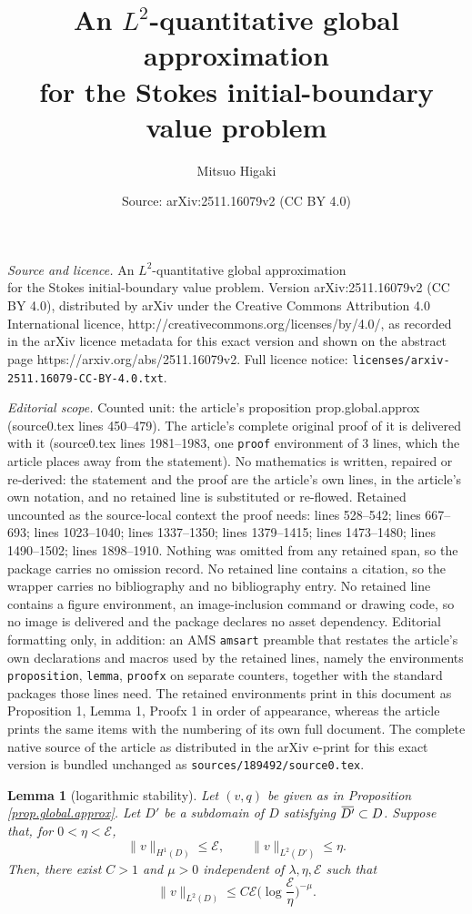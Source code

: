 \documentclass[10pt,a4paper]{amsart}
\title{An $L^2$-quantitative global approximation \\ for the Stokes initial-boundary value problem}
\author{Mitsuo Higaki}
\date{Source: arXiv:2511.16079v2 (CC BY 4.0)}
\newtheorem{lemma}{Lemma}
\newcommand{\overbar}[1]{\mkern 1.5mu\overline{\mkern-1.5mu#1\mkern-1.5mu}\mkern 1.5mu}
\begin{document}
\maketitle

\noindent\emph{Source and licence.} An $L^2$-quantitative global approximation \\ for the Stokes initial-boundary value problem. Version arXiv:2511.16079v2 (CC BY 4.0), distributed by arXiv under the Creative Commons Attribution 4.0 International licence, http://creativecommons.org/licenses/by/4.0/, as recorded in the arXiv licence metadata for this exact version and shown on the abstract page https://arxiv.org/abs/2511.16079v2. Full licence notice: \texttt{licenses/arxiv-2511.16079-CC-BY-4.0.txt}.\par\smallskip

\noindent\textit{Editorial scope.} Counted unit: the article's proposition prop.global.approx (source0.tex lines 450--479). The article's complete original proof of it is delivered with it (source0.tex lines 1981--1983, one \texttt{proof} environment of 3 lines, which the article places away from the statement). No mathematics is written, repaired or re-derived: the statement and the proof are the article's own lines, in the article's own notation, and no retained line is substituted or re-flowed.  Retained uncounted as the source-local context the proof needs: lines 528--542; lines 667--693; lines 1023--1040; lines 1337--1350; lines 1379--1415; lines 1473--1480; lines 1490--1502; lines 1898--1910.  Nothing was omitted from any retained span, so the package carries no omission record.  No retained line contains a citation, so the wrapper carries no bibliography and no bibliography entry.  No retained line contains a figure environment, an image-inclusion command or drawing code, so no image is delivered and the package declares no asset dependency.  Editorial formatting only, in addition: an AMS \texttt{amsart} preamble that restates the article's own declarations and macros used by the retained lines, namely the environments \texttt{proposition}, \texttt{lemma}, \texttt{proofx} on separate counters, together with the standard packages those lines need.  The retained environments print in this document as Proposition 1, Lemma 1, Proofx 1 in order of appearance, whereas the article prints the same items with the numbering of its own full document.  The complete native source of the article as distributed in the arXiv e-print for this exact version is bundled unchanged as \texttt{sources/189492/source0.tex}.
\begin{lemma}[logarithmic stability]\label{lem.est.stab}
Let $(v, q)$ be given as in Proposition \ref{prop.global.approx}. Let $D'$ be a subdomain of $D$ satisfying $\overbar{D'} \subset D$. Suppose that, for $0<\eta<\mathcal{E}$, 
\[
    \|v\|_{H^1(D)} \le \mathcal{E}, 
    \qquad
    \|v\|_{L^2(D')} \le \eta. 
\]
Then, there exist $C>1$ and $\mu>0$ independent of $\lambda, \eta, \mathcal{E}$ such that 
\begin{equation}\label{est.stab}
    \|v\|_{L^2(D)}
    \le 
    C \mathcal{E} 
    \bigg(\log \frac{\mathcal{E}}{\eta} \bigg)^{-\mu}. 
\end{equation}
\end{lemma}
\end{document}
